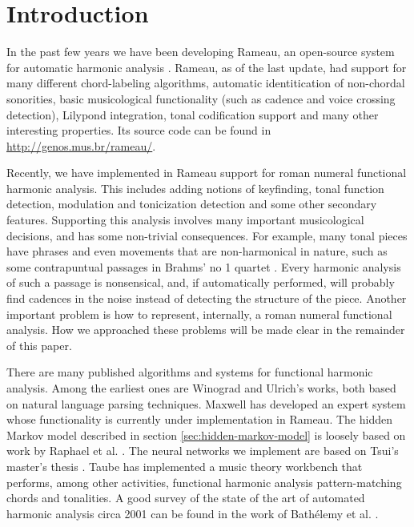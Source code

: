 
\section{Introduction}
\label{sec:introduction}

In the past few years we have been developing Rameau, an open-source
system for automatic harmonic analysis \cite{kroger08:rameau}. Rameau,
as of the last update, had support for many different chord-labeling
algorithms, automatic identitication of non-chordal sonorities, basic
musicological functionality (such as cadence and voice crossing
detection), Lilypond \cite{nienhuys.ea08:lilypond} integration, tonal
codification support and many other interesting properties. Its source
code can be found in \url{http://genos.mus.br/rameau/}.

Recently, we have implemented in Rameau support for roman numeral
functional harmonic analysis. This includes adding notions of
keyfinding, tonal function detection, modulation and tonicization
detection and some other secondary features. Supporting this analysis
involves many important musicological decisions, and has some
non-trivial consequences. For example, many tonal pieces have phrases
and even movements that are non-harmonical in nature, such as some
contrapuntual passages in Brahms' no 1 quartet . Every harmonic analysis of such a passage is nonsensical,
and, if automatically performed, will probably find cadences in the
noise instead of detecting the structure of the piece. Another
important problem is how to represent, internally, a roman numeral
functional analysis. How we approached these problems will be made
clear in the remainder of this paper.

There are many published algorithms and systems for functional
harmonic analysis. Among the earliest ones are Winograd
\cite{winograd68:linguistics} and Ulrich's \cite{ulrich77:analysis}
works, both based on natural language parsing techniques. Maxwell
\cite{maxwell92:expert} has developed an expert system whose
functionality is currently under implementation in Rameau. The hidden
Markov model described in section \ref{sec:hidden-markov-model} is
loosely based on work by Raphael et
al. \cite{raphael.ea03:harmonic}. The neural networks we implement are
based on Tsui's master's thesis \cite{tsui02:harmonic}. Taube
\cite{taube99:automatic} has implemented a music theory workbench that
performs, among other activities, functional harmonic analysis
pattern-matching chords and tonalities. A good survey of the state of
the art of automated harmonic analysis circa 2001 can be found in the
work of Bathélemy et al. \cite{barthelemy.ea01:figured}.

